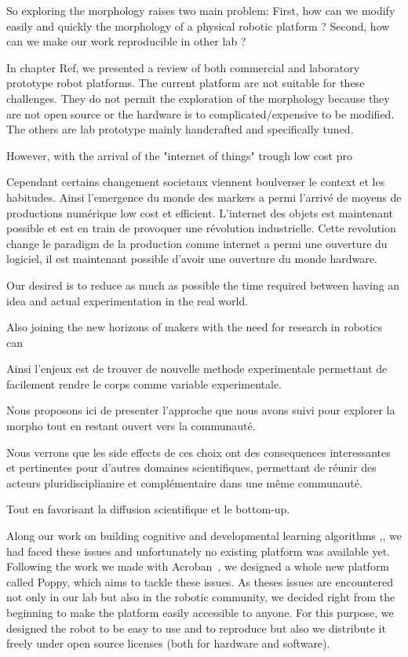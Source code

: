 So exploring the morphology raises two main problem:
First, how can we modify easily and quickly the morphology of a physical robotic platform ?
Second, how can we make our work reproducible in other lab ?

In chapter Ref, we presented a review of both commercial and laboratory prototype robot platforms. The current platform are not suitable for these challenges. They do not permit the exploration of the morphology because they are not open source or the hardware is to complicated/expensive to be modified. The others are lab prototype mainly handcrafted and specifically tuned.

However, with the arrival of the "internet of things" trough low cost pro\cite{anderson}

Cependant certains changement societaux viennent boulverser le context et les habitudes. Ainsi l'emergence du monde des markers a permi l'arrivé de moyens de productions numérique low cost et efficient. L'internet des objets est maintenant possible et est en train de provoquer une révolution industrielle.
Cette revolution change le paradigm de la production comme internet a permi une ouverture du logiciel, il est maintenant possible d'avoir une ouverture du monde hardware.

Our desired is to reduce as much as possible the time required between having an idea and actual experimentation in the real world.


Also joining the new horizons of makers with the need for research in robotics can

Ainsi l'enjeux est de trouver de nouvelle methode experimentale permettant de facilement rendre le corps comme variable experimentale.

Nous proposons ici de presenter l'approche que nous avons suivi pour explorer la morpho tout en restant ouvert vers la communauté.

Nous verrons que les side effects de ces choix ont des consequences interessantes et pertinentes pour d'autres domaines scientifiques, permettant de réunir des acteurs pluridisciplianire et complémentaire dans une même communauté.

Tout en favorisant la diffusion scientifique et le bottom-up.

Along our work on building cognitive and developmental learning algorithms \cite{Oudeyer07},\cite{moulin2013exploration}, we had faced these issues and unfortunately no existing platform was available yet. Following the work we made with Acroban~\cite{Ly2010}, we designed a whole new platform called Poppy, which aims to tackle these issues. As theses issues are encountered not only in our lab but also in the robotic community, we decided right from the beginning to make the platform easily accessible to anyone. For this purpose, we designed the robot to be easy to use and to reproduce but also we distribute it freely under open source licenses (both for hardware and software).

